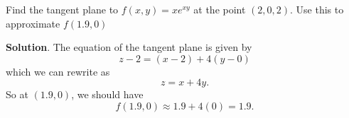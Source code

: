 \documentclass[10pt,]{book}
\theoremstyle{ptxplainnotitle}
\theoremstyle{ptxplaintitle}
\theoremstyle{ptxplainnotitle}
\theoremstyle{ptxplaintitle}
\theoremstyle{ptxplainnotitle}
\theoremstyle{ptxplaintitle}
\theoremstyle{ptxdefinitionnotitle}
\theoremstyle{ptxdefinitiontitle}
\theoremstyle{ptxdefinitionnotitle}
\theoremstyle{ptxdefinitiontitle}
\theoremstyle{ptxdefinitionnotitle}
\theoremstyle{ptxdefinitiontitle}
\theoremstyle{ptxdefinitionnotitle}
\theoremstyle{ptxdefinitiontitle}
\theoremstyle{ptxdefinitionnotitle}
\theoremstyle{ptxdefinitiontitle}
\numberwithin{equation}{section}
\begin{document}
\begin{example}\label{example-approximations-by-tangent-planes}
\hypertarget{p-1030}{}%
Find the tangent plane to \(f(x,y) = xe^{xy}\) at the point \((2,0,2)\). Use this to approximate \(f(1.9,0)\)%
\par\smallskip%
\noindent\textbf{Solution}.\hypertarget{solution-159}{}\quad%
\hypertarget{p-1031}{}%
The equation of the tangent plane is given by%
\begin{equation*}
z - 2 = (x - 2) + 4(y - 0)
\end{equation*}
which we can rewrite as%
\begin{equation*}
z = x + 4y.
\end{equation*}
So at \((1.9,0)\), we should have%
\begin{equation*}
f(1.9,0)\approx 1.9 + 4(0) = 1.9.
\end{equation*}
%
\end{example}
\typeout{************************************************}
\typeout{************************************************}
\end{document}
